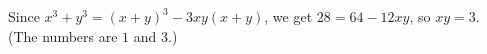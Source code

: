 Since $x^3+y^3=(x+y)^3-3xy(x+y)$, we get $28=64-12xy$, so $xy=\boxed{3}$. (The numbers are $1$ and $3$.)
